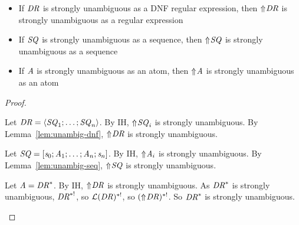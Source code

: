 \documentclass[numbers,10pt,preprint\ifanon ,nocopyrightspace\fi]{sigplanconf}
\begin{document}
\begin{lemma}
  \label{lem:retaining-unambiguity-toregex}
  \begin{itemize}
  \item 
    If $\mathit{DR}$ is strongly unambiguous as a DNF regular expression, then
    $\Uparrow\mkern-4mu \mathit{DR}$ is strongly unambiguous as a regular expression
  \item
    If $\mathit{SQ}$ is strongly unambiguous as a sequence, then
    $\Uparrow\mkern-4mu \mathit{SQ}$ is strongly unambiguous as a sequence
  \item
    If $\mathit{A}$ is strongly unambiguous as an atom, then
    $\Uparrow\mkern-4mu \mathit{A}$ is strongly unambiguous as an atom
  \end{itemize}
\end{lemma}
\begin{proof}
  \begin{case}[\MultiOrDNFRegexType{}]
    Let $\mathit{DR} = \langle\mathit{SQ}_1;\ldots;\mathit{SQ}_n\rangle$.
    By IH, $\Uparrow\mkern-4mu \mathit{SQ}_i$ is strongly unambiguous.
    By Lemma~\ref{lem:unambig-dnf}, $\Uparrow\mkern-4mu \mathit{DR}$ is strongly
    unambiguous.
  \end{case}

  \begin{case}[\MultiConcatSequenceType{}]
    Let $\mathit{SQ} = [\mathit{s}_0;\mathit{A}_1;\ldots;\mathit{A}_n;\mathit{s}_n]$.
    By IH, $\Uparrow\mkern-4mu \mathit{A}_i$ is strongly unambiguous.
    By Lemma~\ref{lem:unambig-seq}, $\Uparrow\mkern-4mu \mathit{SQ}$ is strongly
    unambiguous.
  \end{case}

  \begin{case}[StarAtomType]
    Let $\mathit{A} = {\mathit{DR}}^*$.
    By IH, $\Uparrow\mkern-4mu \mathit{DR}$ is strongly unambiguous.
    As ${\mathit{DR}}^*$ is strongly unambiguous, $\mathit{DR}^{*!}$,
    so $\mathcal{L}(\mathit{DR})^{*!}$, so
    $(\Uparrow\mkern-4mu \mathit{DR})^{*!}$.
    So ${\mathit{DR}}^*$ is strongly unambiguous.
  \end{case}
\end{proof}
\end{document}

